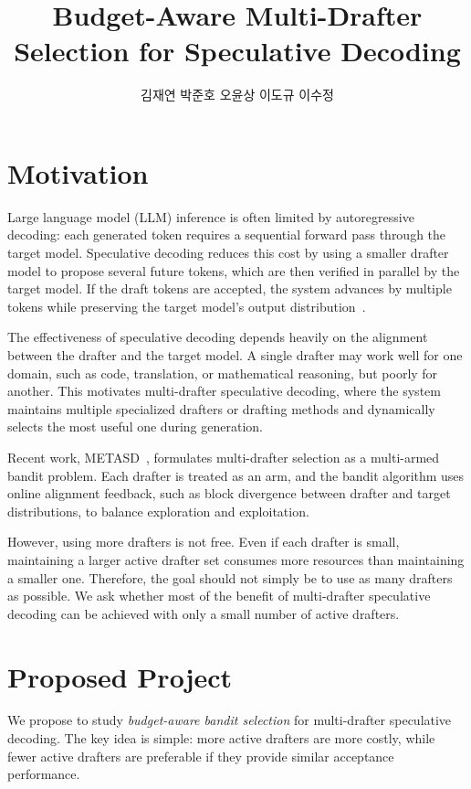 \documentclass[11pt]{article}
\title{\vspace{-1.8em}Budget-Aware Multi-Drafter Selection for Speculative Decoding}
\author{김재연 \quad 박준호 \quad 오윤상 \quad 이도규 \quad 이수정}
\date{}
\begin{document}
\maketitle
\vspace{-1.8em}

\section{Motivation}

Large language model (LLM) inference is often limited by autoregressive decoding: each generated token requires a sequential forward pass through the target model. Speculative decoding reduces this cost by using a smaller drafter model to propose several future tokens, which are then verified in parallel by the target model. If the draft tokens are accepted, the system advances by multiple tokens while preserving the target model's output distribution~\cite{specdec}.

The effectiveness of speculative decoding depends heavily on the alignment between the drafter and the target model. A single drafter may work well for one domain, such as code, translation, or mathematical reasoning, but poorly for another. This motivates multi-drafter speculative decoding, where the system maintains multiple specialized drafters or drafting methods and dynamically selects the most useful one during generation.

Recent work, METASD~\cite{metasd}, formulates multi-drafter selection as a multi-armed bandit problem. Each drafter is treated as an arm, and the bandit algorithm uses online alignment feedback, such as block divergence between drafter and target distributions, to balance exploration and exploitation.

However, using more drafters is not free. Even if each drafter is small, maintaining a larger active drafter set consumes more resources than maintaining a smaller one. Therefore, the goal should not simply be to use as many drafters as possible. We ask whether most of the benefit of multi-drafter speculative decoding can be achieved with only a small number of active drafters.

\section{Proposed Project}

We propose to study \emph{budget-aware bandit selection} for multi-drafter speculative decoding. The key idea is simple: more active drafters are more costly, while fewer active drafters are preferable if they provide similar acceptance performance.
\end{document}
